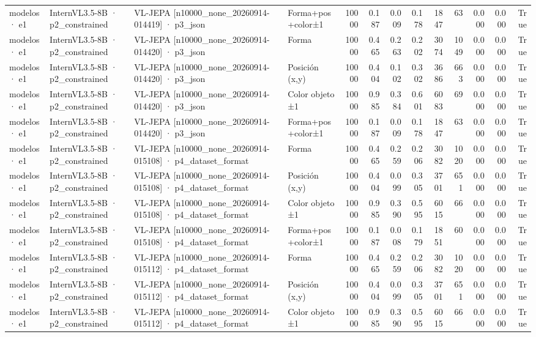 \begin{tabular}{llllrrrrrrrrr}
modelos · e1 & InternVL3.5-8B · p2\_constrained & VL-JEPA [n10000\_none\_20260914-014419] · p3\_json & Forma+pos+color±1 & 10000 & 0.187 & 0.009 & 0.178 & 1847 & 63 & 0.000 & 0.000 & True \\
modelos · e1 & InternVL3.5-8B · p2\_constrained & VL-JEPA [n10000\_none\_20260914-014420] · p3\_json & Forma & 10000 & 0.465 & 0.263 & 0.202 & 3074 & 1049 & 0.000 & 0.000 & True \\
modelos · e1 & InternVL3.5-8B · p2\_constrained & VL-JEPA [n10000\_none\_20260914-014420] · p3\_json & Posición (x,y) & 10000 & 0.404 & 0.102 & 0.302 & 3686 & 663 & 0.000 & 0.000 & True \\
modelos · e1 & InternVL3.5-8B · p2\_constrained & VL-JEPA [n10000\_none\_20260914-014420] · p3\_json & Color objeto ±1 & 10000 & 0.985 & 0.384 & 0.601 & 6083 & 69 & 0.000 & 0.000 & True \\
modelos · e1 & InternVL3.5-8B · p2\_constrained & VL-JEPA [n10000\_none\_20260914-014420] · p3\_json & Forma+pos+color±1 & 10000 & 0.187 & 0.009 & 0.178 & 1847 & 63 & 0.000 & 0.000 & True \\
modelos · e1 & InternVL3.5-8B · p2\_constrained & VL-JEPA [n10000\_none\_20260914-015108] · p4\_dataset\_format & Forma & 10000 & 0.465 & 0.259 & 0.206 & 3082 & 1020 & 0.000 & 0.000 & True \\
modelos · e1 & InternVL3.5-8B · p2\_constrained & VL-JEPA [n10000\_none\_20260914-015108] · p4\_dataset\_format & Posición (x,y) & 10000 & 0.404 & 0.099 & 0.305 & 3701 & 651 & 0.000 & 0.000 & True \\
modelos · e1 & InternVL3.5-8B · p2\_constrained & VL-JEPA [n10000\_none\_20260914-015108] · p4\_dataset\_format & Color objeto ±1 & 10000 & 0.985 & 0.390 & 0.595 & 6015 & 66 & 0.000 & 0.000 & True \\
modelos · e1 & InternVL3.5-8B · p2\_constrained & VL-JEPA [n10000\_none\_20260914-015108] · p4\_dataset\_format & Forma+pos+color±1 & 10000 & 0.187 & 0.008 & 0.179 & 1851 & 60 & 0.000 & 0.000 & True \\
modelos · e1 & InternVL3.5-8B · p2\_constrained & VL-JEPA [n10000\_none\_20260914-015112] · p4\_dataset\_format & Forma & 10000 & 0.465 & 0.259 & 0.206 & 3082 & 1020 & 0.000 & 0.000 & True \\
modelos · e1 & InternVL3.5-8B · p2\_constrained & VL-JEPA [n10000\_none\_20260914-015112] · p4\_dataset\_format & Posición (x,y) & 10000 & 0.404 & 0.099 & 0.305 & 3701 & 651 & 0.000 & 0.000 & True \\
modelos · e1 & InternVL3.5-8B · p2\_constrained & VL-JEPA [n10000\_none\_20260914-015112] · p4\_dataset\_format & Color objeto ±1 & 10000 & 0.985 & 0.390 & 0.595 & 6015 & 66 & 0.000 & 0.000 & True \\

\end{tabular}
